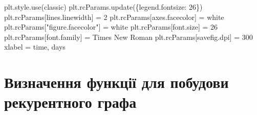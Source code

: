 \documentclass[
  letterpaper,
]{report}
\newenvironment{Shaded}{\begin{snugshade}}{\end{snugshade}}
\newcommand{\DecValTok}[1]{\textcolor[rgb]{0.68,0.00,0.00}{#1}}
\newcommand{\NormalTok}[1]{\textcolor[rgb]{0.00,0.23,0.31}{#1}}
\newcommand{\OperatorTok}[1]{\textcolor[rgb]{0.37,0.37,0.37}{#1}}
\newcommand{\StringTok}[1]{\textcolor[rgb]{0.13,0.47,0.30}{#1}}
\begin{document}
\begin{Shaded}
\begin{Highlighting}[]
\NormalTok{plt.style.use(}\StringTok{\textquotesingle{}classic\textquotesingle{}}\NormalTok{)}
\NormalTok{plt.rcParams.update(\{}\StringTok{\textquotesingle{}legend.fontsize\textquotesingle{}}\NormalTok{: }\DecValTok{26}\NormalTok{\})}
\NormalTok{plt.rcParams[}\StringTok{\textquotesingle{}lines.linewidth\textquotesingle{}}\NormalTok{] }\OperatorTok{=} \DecValTok{2}
\NormalTok{plt.rcParams[}\StringTok{\textquotesingle{}axes.facecolor\textquotesingle{}}\NormalTok{] }\OperatorTok{=} \StringTok{\textquotesingle{}white\textquotesingle{}}
\NormalTok{plt.rcParams[}\StringTok{"figure.facecolor"}\NormalTok{] }\OperatorTok{=} \StringTok{\textquotesingle{}white\textquotesingle{}}
\NormalTok{plt.rcParams[}\StringTok{\textquotesingle{}font.size\textquotesingle{}}\NormalTok{] }\OperatorTok{=} \StringTok{\textquotesingle{}26\textquotesingle{}}
\NormalTok{plt.rcParams[}\StringTok{\textquotesingle{}font.family\textquotesingle{}}\NormalTok{] }\OperatorTok{=} \StringTok{\textquotesingle{}Times New Roman\textquotesingle{}}
\NormalTok{plt.rcParams[}\StringTok{\textquotesingle{}savefig.dpi\textquotesingle{}}\NormalTok{] }\OperatorTok{=} \DecValTok{300}
\NormalTok{xlabel }\OperatorTok{=} \StringTok{\textquotesingle{}time, days\textquotesingle{}}
\end{Highlighting}
\end{Shaded}

\hypertarget{ux432ux438ux437ux43dux430ux447ux435ux43dux43dux44f-ux444ux443ux43dux43aux446ux456ux457-ux434ux43bux44f-ux43fux43eux431ux443ux434ux43eux432ux438-ux440ux435ux43aux443ux440ux435ux43dux442ux43dux43eux433ux43e-ux433ux440ux430ux444ux430}{%
\section{Визначення функції для побудови рекурентного
графа}\label{ux432ux438ux437ux43dux430ux447ux435ux43dux43dux44f-ux444ux443ux43dux43aux446ux456ux457-ux434ux43bux44f-ux43fux43eux431ux443ux434ux43eux432ux438-ux440ux435ux43aux443ux440ux435ux43dux442ux43dux43eux433ux43e-ux433ux440ux430ux444ux430}}
\end{document}
